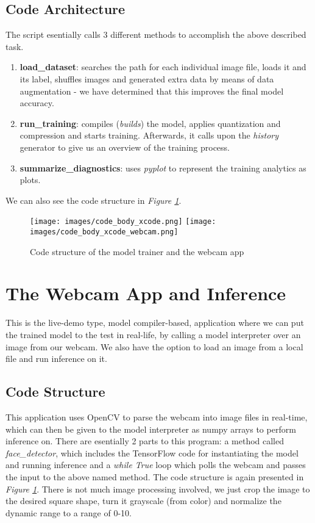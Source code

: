 \subsection{Code Architecture}
The script esentially calls 3 different methods to accomplish the above described task. 
\begin{enumerate}
    \item \textbf{load\_dataset}: searches the path for each individual image file, loads it and its label, shuffles images and generated extra data by means of data augmentation - we have determined that this improves the final model accuracy. 
    \item \textbf{run\_training}: compiles (\textit{builds}) the model, applies quantization and compression and starts training. Afterwards, it calls upon the \textit{history} generator to give us an overview of the training process.
    \item \textbf{summarize\_diagnostics}: uses \textit{pyplot} to represent the training analytics as plots.
\end{enumerate}
We can also see the code structure in \textit{Figure \ref{xcode_struct}}.

\begin{figure}
    \centering
    \texttt{[image: images/code\_body\_xcode.png]}
    \quad
    \texttt{[image: images/code\_body\_xcode\_webcam.png]}
    \caption{Code structure of the model trainer and the webcam app}
    \label{xcode_struct}
\end{figure}

\section{The Webcam App and Inference}
This is the live-demo type, model compiler-based, application where we can put the trained model to the test in real-life, by calling a model interpreter over an image from our webcam. We also have the option to load an image from a local file and run inference on it. 
\subsection{Code Structure}
This application uses OpenCV to parse the webcam into image files in real-time, which can then be given to the model interpreter as numpy arrays to perform inference on. There are esentially 2 parts to this program: a method called \textit{face\_detector}, which includes the TensorFlow code for instantiating the model and running inference and a \textit{while True} loop which polls the webcam and passes the input to the above named method. The code structure is again presented in \textit{Figure \ref{xcode_struct}}. There is not much image processing involved, we just crop the image to the desired square shape, turn it grayscale (from color) and normalize the dynamic range to a range of 0-10.
